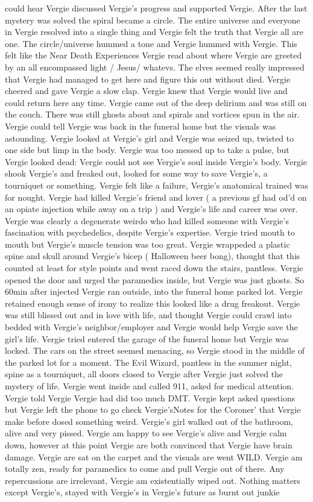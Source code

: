 \documentclass[12pt]{book}
\begin{document}
could hear Vergie discussed Vergie's progress and supported Vergie. After the last mystery was solved the spiral became a circle. The entire universe and everyone in Vergie resolved into a single thing and Vergie felt the truth that Vergie all are one. The circle/universe hummed a tone and Vergie hummed with Vergie. This felt like the Near Death Experiences Vergie read about where Vergie are greeted by an all encompassed light / Jesus/ whatevs. The elves seemed really impressed that Vergie had managed to get here and figure this out without died. Vergie cheered and gave Vergie a slow clap. Vergie knew that Vergie would live and could return here any time. Vergie came out of the deep delirium and was still on the couch. There was still ghosts about and spirals and vortices spun in the air. Vergie could tell Vergie was back in the funeral home but the visuals was astounding. Vergie looked at Vergie's girl and Vergie was seized up, twisted to one side but limp in the body. Vergie was too messed up to take a pulse, but Vergie looked dead: Vergie could not see Vergie's soul inside Vergie's body. Vergie shook Vergie's and freaked out, looked for some way to save Vergie's, a tourniquet or something. Vergie felt like a failure, Vergie's anatomical trained was for nought. Vergie had killed Vergie's friend and lover ( a previous gf had od'd on an opiate injection while away on a trip ) and Vergie's life and career was over. Vergie was clearly a degenerate weirdo who had killed someone with Vergie's fascination with psychedelics, despite Vergie's expertise. Vergie tried mouth to mouth but Vergie's muscle tension was too great. Vergie wrappeded a plastic spine and skull around Vergie's bicep ( Halloween beer bong), thought that this counted at least for style points and went raced down the stairs, pantless. Vergie opened the door and urged the paramedics inside, but Vergie was just ghosts. So 60min after injected Vergie ran outside, into the funeral home parked lot. Vergie retained enough sense of irony to realize this looked like a drug freakout. Vergie was still blissed out and in love with life, and thought Vergie could crawl into bedded with Vergie's neighbor/employer and Vergie would help Vergie save the girl's life. Vergie tried entered the garage of the funeral home but Vergie was locked. The cars on the street seemed menacing, so Vergie stood in the middle of the parked lot for a moment. The Evil Wizard, pantless in the summer night, spine as a tourniquet, all doors closed to Vergie after Vergie just solved the mystery of life. Vergie went inside and called 911, asked for medical attention. Vergie told Vergie Vergie had did too much DMT. Vergie kept asked questions but Vergie left the phone to go check Vergie'sNotes for the Coroner' that Vergie make before dosed something weird. Vergie's girl walked out of the bathroom, alive and very pissed. Vergie am happy to see Vergie's alive and Vergie calm down, however at this point Vergie are both convinced that Vergie have brain damage. Vergie are sat on the carpet and the visuals are went WILD. Vergie am totally zen, ready for paramedics to come and pull Vergie out of there. Any repercussions are irrelevant, Vergie am existentially wiped out. Nothing matters except Vergie's, stayed with Vergie's in Vergie's future as burnt out junkie 
\end{document}
